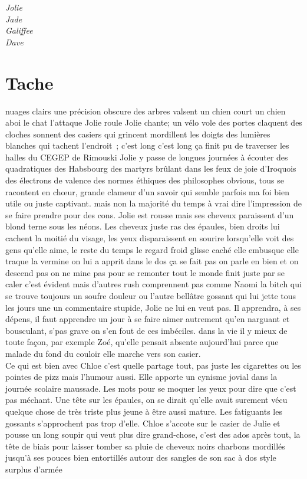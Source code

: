 \documentclass{article}
\begin{document}
\textit{Jolie}\\

\textit{Jade}\\

\textit{Galiffee}\\

\textit{Dave}\\

\clearpage

 \section*{Tache}
 nuages clairs une précision obscure des arbres valsent un chien court un
 chien aboi le chat l’attaque Jolie roule Jolie chante; un vélo vole des portes
 claquent des cloches sonnent des casiers qui grincent mordillent les doigts
 des lumières blanches qui tachent l’endroit ; c’est long c’est long ça finit
 pu de traverser les halles du  CEGEP de Rimouski Jolie y passe de
 longues journées à écouter des quadratiques des Habsbourg des martyrs brûlant
 dans les feux de joie d’Iroquois des électrons de valence des normes éthiques
 des philosophes obvious, tous se racontent en chœur, grande clameur d’un
 savoir qui semble parfois ma foi bien utile ou juste captivant. mais non la
 majorité du temps à vrai dire l’impression de se faire prendre pour des cons.
 Jolie est rousse mais ses cheveux paraissent d’un blond terne sous les néons.
 Les cheveux juste ras des épaules, bien droits lui cachent la moitié du
 visage, les yeux disparaissent en sourire lorsqu’elle voit des gens qu’elle
 aime, le reste du temps le regard froid glisse caché elle embusque elle traque
 la vermine on lui a apprit dans le dos ça se fait pas on parle en bien et on
 descend pas on ne mine pas pour se remonter tout le monde finit juste par se
 caler c’est évident mais d’autres rush comprennent pas comme Naomi la bitch
 qui se trouve toujours un soufre douleur ou l’autre bellâtre gossant qui lui
 jette tous les jours une un commentaire stupide, Jolie ne lui en veut pas. Il
 apprendra, à ses dépens, il faut apprendre un jour à se faire aimer autrement
 qu’en narguant et bousculant, s’pas grave on s’en fout de ces imbéciles. dans
 la vie il y mieux de toute façon, par exemple Zoé, qu’elle pensait absente
 aujourd’hui parce que malade du fond du couloir elle marche vers son casier.\\

Ce qui est bien avec Chloe c’est quelle partage tout, pas juste les cigarettes ou
les pointes de pizz  mais l’humour aussi.  Elle apporte un cynisme jovial dans
la journée scolaire maussade. Les mots pour se moquer les yeux pour dire que
c’est pas méchant.  Une tête sur les épaules, on se dirait qu’elle avait
surement vécu quelque chose de très triste plus jeune à être aussi mature. Les
fatiguants les gossants s’approchent pas trop d’elle.  Chloe s’accote sur le
casier de Julie et pousse un long soupir qui veut plus dire grand-chose, c’est
des ados après tout, la tête de biais pour laisser tomber sa pluie de cheveux
noirs charbons mordillés jusqu'à ses pouces bien entortillés autour des sangles
de son sac à dos style surplus d'armée
\end{document}
